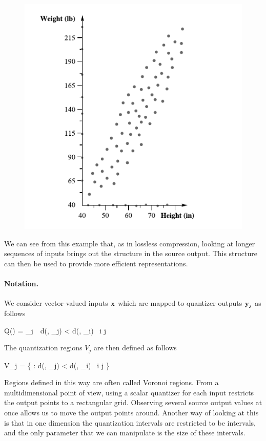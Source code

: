 \begin{figure}[H]
    \centering
    \includegraphics[scale=0.55]{images/2021-08-09_vector_quant_02.png}
\end{figure}

We can see from this example that, as in lossless compression, looking at longer sequences of inputs brings out the structure in the source output. This structure can then be used to provide more efficient representations.

\paragraph{Notation.} We consider vector-valued inputs $\mathbf{x}$ which are mapped to quantizer outputs $\mathbf{y}_j$ as follows

\bee
Q(\xbf) = \ybf_j \quad {} \,\, d(\xbf, \ybf_j) < d(\xbf, \ybf_i) \, \forall i \neq j
\eee

The quantization regions $V_j$ are then defined as follows

\bee
V_j = \{ \xbf: d(\xbf, \ybf_j) < d(\xbf, \ybf_i) \, \forall i \neq j \}
\eee

Regions defined in this way are often called Voronoi regions. From a multidimensional point of view, using a scalar quantizer for each input restricts the output points to a rectangular grid. Observing several source output values at once allows us to move the output points around. Another way of looking at this is that in one dimension the quantization intervals are restricted to be intervals, and the only parameter that we can manipulate is the size of these intervals.


